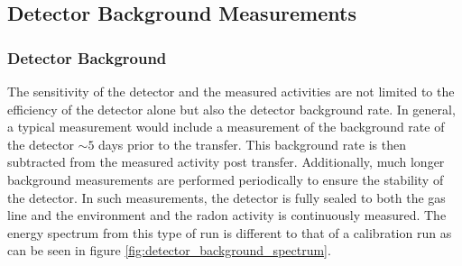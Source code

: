 \subsection{Detector Background Measurements}
\label{secsec:concentration_line}


\subsubsection{Detector Background}

The sensitivity of the detector and the measured activities are not limited to the efficiency of the detector alone but also the detector background rate. In general, a typical measurement would include a measurement of the background rate of the detector $\sim5$ days prior to the transfer. This background rate is then subtracted from the measured activity post transfer. Additionally, much longer background measurements are performed periodically to ensure the stability of the detector. In such measurements, the detector is fully sealed to both the gas line and the environment and the radon activity is continuously measured. The energy spectrum from this type of run is different to that of a calibration run as can be seen in figure \ref{fig:detector_background_spectrum}.
%
